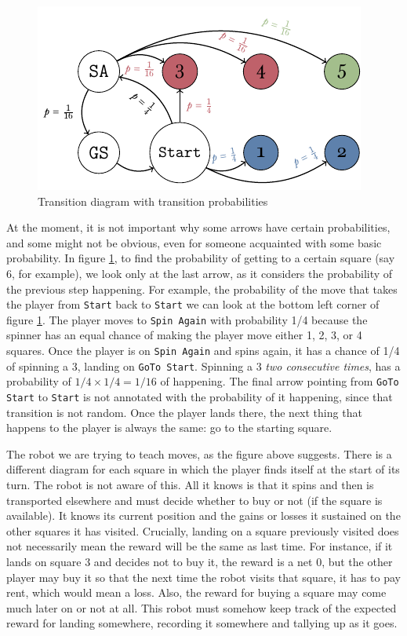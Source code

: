 \begin{figure}[h]
	\centering
	\includegraphics[width=\textwidth]{img/transicion-markov.pdf}
	\caption{Transition diagram with transition probabilities}
	\label{fig:annotated-markov-start}
\end{figure}

At the moment, it is not important why some arrows have certain probabilities,
and some might not be obvious, even for someone acquainted with some basic
probability. In figure \ref{fig:annotated-markov-start}, to find the probability
of getting to a certain square (say 6, for example), we look only at the last
arrow, as it considers the probability of the previous step happening. For
example, the probability of the move that takes the player from \texttt{Start}
back to \texttt{Start} we can look at the bottom left corner of figure
\ref{fig:annotated-markov-start}. The player moves to \texttt{Spin Again} with
probability 1/4 because the spinner has an equal chance of making the player
move either 1, 2, 3, or 4 squares. Once the player is on \texttt{Spin Again} and
spins again, it has a chance of 1/4 of spinning a 3, landing on \texttt{GoTo
Start}. Spinning a 3 \textit{two consecutive times}, has a probability of $1/4
\times 1/4 = 1/16$ of happening. The final arrow pointing from \texttt{GoTo
Start} to \texttt{Start} is not annotated with the probability of it happening,
since that transition is not random. Once the player lands there, the next thing
that happens to the player is always the same: go to the starting square.

The robot we are trying to teach moves, as the figure above suggests. There is a
different diagram for each square in which the player finds itself at the start
of its turn. The robot is not aware of this. All it knows is that it spins and
then is transported elsewhere and must decide whether to buy or not (if the
square is available). It knows its current position and the gains or losses it
sustained on the other squares it has visited. Crucially, landing on a square
previously visited does not necessarily mean the reward will be the same as last
time. For instance, if it lands on square 3 and decides not to buy it, the
reward is a net 0, but the other player may buy it so that the next time the
robot visits that square, it has to pay rent, which would mean a loss. Also, the
reward for buying a square may come much later on or not at all. This robot must
somehow keep track of the expected reward for landing somewhere, recording it
somewhere and tallying up as it goes.

